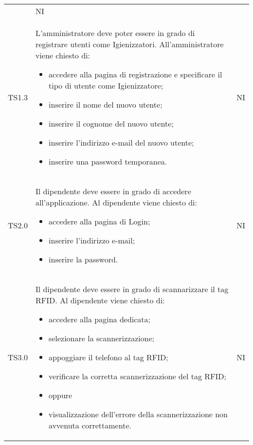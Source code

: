 {\begin{longtable}{ c C{11cm} c }
\begin{itemize}
        \end{itemize}&
        NI\\

        TS1.3&
        L'amministratore deve poter essere in grado di registrare utenti come Igienizzatori.\newline
        All'amministratore viene chiesto di:
        \begin{itemize}
            \item accedere alla pagina di registrazione e specificare il tipo di utente come Igienizzatore;
            \item inserire il nome del nuovo utente;
            \item inserire il cognome del nuovo utente;
            \item inserire l'indirizzo e-mail del nuovo utente;
            \item inserire una password temporanea.
            
        \end{itemize}&
        NI\\

        TS2.0&
        Il dipendente deve essere in grado di accedere all'applicazione.\newline
        Al dipendente viene chiesto di:
        \begin{itemize}
            \item accedere alla pagina di Login;
            \item inserire l'indirizzo e-mail;
            \item inserire la password.
        \end{itemize}&
        NI\\

        TS3.0&
        Il dipendente deve essere in grado di scannarizzare il tag RFID.\newline
        Al dipendente viene chiesto di:
        \begin{itemize}
            \item accedere alla pagina dedicata;
            \item selezionare la scannerizzazione;
            \item appoggiare il telefono al tag RFID;
            \item verificare la corretta scannerizzazione del tag RFID;
            \item [] oppure
            \item visualizzazione dell'errore della scannerizzazione non avvenuta correttamente.
        \end{itemize}&
        NI\\


\end{longtable}}
